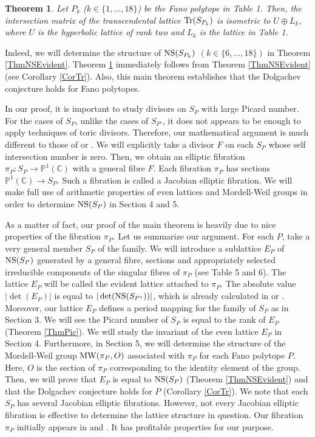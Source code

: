 \documentclass[10pt]{article}
\newtheorem{thm}{Theorem}[section]
\begin{document}
\begin{thm}\label{ThmMain}
Let $P_k$ ($k\in \{1,\ldots,18\}$) be the Fano polytope in Table 1.
Then, the intersection matrix of the transcendental lattice ${\rm Tr}(S_{P_k})$ is isometric to $U\oplus L_k$,
where $U$ is the hyperbolic lattice of rank two
and $L_k$ is the lattice in Table 1.
\end{thm}

Indeed, 
we will determine the structure of ${\rm NS} (S_{P_k})$ $(k\in \{6,\ldots,18\})$ in Theorem \ref{ThmNSEvident}.
Theorem \ref{ThmMain} immediately follows from  Theorem \ref{ThmNSEvident} (see Corollary \ref{CorTr}).
Also, this main theorem establishes that  the Dolgachev conjecture holds for Fano polytopes.

In our proof, it is important to study divisors on  $S_P$ with large Picard number.
For the cases of $S_P$,
unlike the cases of $S_{P^\circ}$,
it does not appears to be enough to apply  techniques of toric divisors.
Therefore,
our mathematical argument is much different to those of \cite{K2} or \cite{Mase}.
We will explicitly take a divisor  $F$ on each $S_P$ whose self intersection number is zero.  
Then, 
we obtain an elliptic fibration $\pi_P: S_P \rightarrow \mathbb{P}^1 (\mathbb{C})$
with a general fibre $F$.
Each  fibration $\pi_P$ has  sections $\mathbb{P}^1(\mathbb{C}) \rightarrow S_P$.
Such a fibration  is called a Jacobian elliptic fibration.
We will make full use of arithmetic properties of even lattices and  Mordell-Weil groups  in order to determine ${\rm NS}(S_P)$ in Section 4 and 5.

As a matter of fact,
our proof of the main theorem is heavily due to nice properties of the fibration $\pi_P$.
Let us summarize our argument.
For each $P$, take a very general member $S_P$ of the family.
We will introduce  a sublattice $E_P$ of ${\rm NS}(S_P)$ generated by a general fibre, sections and  appropriately selected irreducible components of the singular fibres of $\pi_P$ (see Table 5 and 6). 
The lattice $E_P$ will be called the evident lattice attached to $\pi_P.$
The absolute value $|\det (E_P)|$  is equal to $|\det({\rm NS}(S_{P^\circ}))|$,
which is already calculated in \cite{K2} or \cite{Mase}.
Moreover,
our lattice $E_P$ defines  a period mapping for the family of $S_P$  as in Section 3.
We will see  the Picard number of $S_P$ is equal to the rank of $E_P$ (Theorem \ref{ThmPic}). 
We will study the invariant of the even lattice $E_P$ in Section 4.
Furthermore, in Section 5, we will determine the structure of the Mordell-Weil group ${\rm MW}(\pi_P,O)$ associated with $\pi_P$ for each Fano polytope $P$.
Here, $O $ is the section of $\pi_P$ corresponding to the identity element of the group.
Then, we will prove that $E_P$ is equal to ${\rm NS}(S_P)$ (Theorem \ref{ThmNSEvident}) and that the Dolgachev conjecture holds for $P$ (Corollary \ref{CorTr}).
We note that each $S_P$  has  several Jacobian elliptic fibrations.
However,
not every Jacobian elliptic fibration is effective to determine the lattice structure in question.
Our fibration $\pi_P$ initially  appears in \cite{M1} and \cite{M2}.
It  has profitable properties for our purpose.
\end{document}
